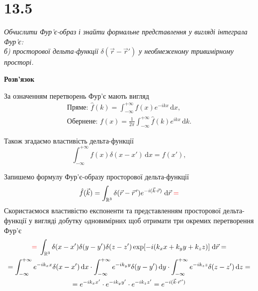 %
%
%
%
%

\section[Задача №13.5]{13.5}

\textit{Обчислити Фур’є-образ і знайти формальне представлення у вигляді інтеграла Фур’є:\\ 
б) просторової дельта-функції $\delta(\vec{r} - \vec{r}')$ у необмеженому тривимірному просторі.}

\begin{center}
    \large{\textbf{Розв'язок}}
\end{center}

За означенням перетворень Фур'є мають вигляд
\begin{equation}
    \begin{gathered}
        \text{Пряме: } \hat{f}(k) = \int_{-\infty}^{+\infty} f(x) e^{-ikx} \, \mathrm{d}x, \\
        \text{Обернене: } f(x) = \frac{1}{2\pi} \int_{-\infty}^{+\infty} \hat{f}(k) e^{ikx} \, \mathrm{d}k.
    \end{gathered}
\end{equation}

Також згадаємо властивість дельта-функції 
\begin{equation}
    \int_{-\infty}^{+\infty} f(x) \delta(x - x') \, \mathrm{d}x = f(x'), 
\end{equation}

Запишемо формулу Фур'є-образу просторової дельта-функції 
\begin{equation}
    \hat{f}(\vec{k}) = \int_{\mathbb{R}^3} \delta(\vec{r} - \vec{r}^{\,\prime}) e^{-i(\vec{k}\cdot\vec{r})} \; \mathrm{d}\vec{r} \; \textcolor{red}{=} 
\end{equation}
Скористаємося властивістю експоненти та представленням просторової дельта-функції у вигляді добутку одновимірних щоб отримати три окремих перетворення Фур'є
\begin{equation*}
    \begin{gathered}
        \textcolor{red}{=} \; \int_{\mathbb{R}^3} \delta(x - x') \delta(y - y') \delta(z - z') \exp[-i (k_x x + k_y y + k_z z)] \; \mathrm{d}\vec{r} = \\
        = \int_{-\infty}^{+\infty} e^{-ik_x x} \delta(x - x') \, \mathrm{d}x \cdot \int_{-\infty}^{+\infty} e^{-ik_y y} \delta(y - y') \, \mathrm{d}y \cdot \int_{-\infty}^{+\infty} e^{-ik_z z} \delta(z - z') \, \mathrm{d}z =\\
        = e^{-ik_x x'} \cdot e^{-ik_y y'} \cdot e^{-ik_z z'} = e^{-i(\vec{k}\cdot\vec{r}^{\,\prime})}
    \end{gathered}
\end{equation*}


